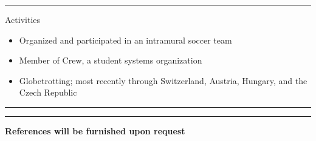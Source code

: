 \documentclass[10pt]{letter}
\begin{document}
\rule{\linewidth}{.5pt}

{\Large Activities}
\begin{itemize}
\setlength\itemsep{1pt}
\item Organized and participated in an intramural soccer team
\item Member of Crew, a student systems organization
\item Globetrotting; most recently through Switzerland, Austria, Hungary, and the Czech Republic
\end{itemize}

\rule{\linewidth}{.5pt}

\vspace{-15pt}

\rule{\linewidth}{.5pt}

\begin{center}\textbf{References will be furnished upon request}\end{center}
\end{document}
